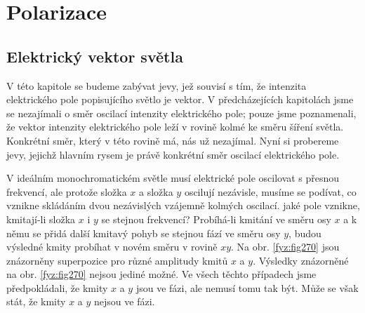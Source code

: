 \setchaptertoc
\chapter{Polarizace}\label{fyz:IchapXXXIII}
  \section{Elektrický vektor světla}\label{fyz:IchapXXXIIIsecI}
    V této kapitole se budeme zabývat jevy, jež souvisí s tím, že intenzita elektrického pole
    popisujícího světlo je vektor. V předcházejících kapitolách jsme se nezajímali o směr oscilací
    intenzity elektrického pole; pouze jsme poznamenali, že vektor intenzity elektrického pole leží
    v rovině kolmé ke směru šíření světla. Konkrétní směr, který v této rovině má, nás už nezajímal.
    Nyní si probereme jevy, jejichž hlavním rysem je právě konkrétní směr oscilací elektrického
    pole.

    V ideálním monochromatickém světle musí elektrické pole oscilovat s přesnou frekvencí, ale
    protože složka \(x\) a složka \(y\) oscilují nezávisle, musíme se podívat, co vznikne skládáním
    dvou nezávislých vzájemně kolmých oscilací. jaké pole vznikne, kmitají-li složka \(x\) i \(y\)
    se stejnou frekvencí? Probíhá-li kmitání ve směru osy \(x\) a k němu se přidá další kmitavý
    pohyb se stejnou fází ve směru osy \(y\), budou výsledné kmity probíhat v novém směru v rovině
    \(xy\). Na obr. \ref{fyz:fig270} jsou znázorněny superpozice pro různé amplitudy kmitů \(x\) a
    \(y\). Výsledky znázorněné na obr. \ref{fyz:fig270} nejsou jediné možné. Ve všech těchto
    případech jsme předpokládali, že kmity \(x\) a \(y\) jsou ve fázi, ale nemusí tomu tak být. Může
    se však stát, že kmity \(x\) a \(y\) nejsou ve fázi.

